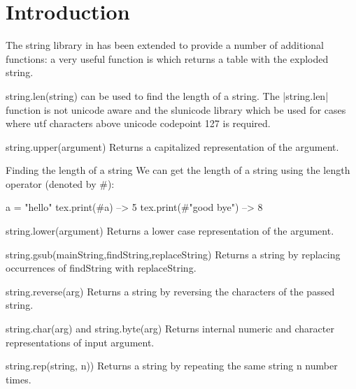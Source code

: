 \section{Introduction}


The \LUA string library in \LUA\tex has been extended to provide a number of additional functions: a very useful function is  which returns a table with the exploded string. 


\begin{docLua}{string.len(string)} 
can be used to find the length of a string.
The |string.len| function is not unicode aware and the slunicode library which be used for cases where utf characters above unicode codepoint 127 is required.
\end{docLua}


\begin{docLua}{string.upper(argument)}
Returns a capitalized representation of the argument.
\end{docLua}
\begin{texexample}{Finding the length of a string}{}
We can get the length of a string using the length operator (denoted by \#):
\begin{luacode}
a = "hello"
tex.print(#a) --> 5
tex.print(#"good bye") --> 8
\end{luacode}
\end{texexample}



\begin{docLua}{string.lower(argument)}
Returns a lower case representation of the argument.
\end{docLua}

\begin{docLua}{string.gsub(mainString,findString,replaceString)}
Returns a string by replacing occurrences of findString with replaceString.
\end{docLua}

\begin{docLua}{string.reverse(arg)}
Returns a string by reversing the characters of the passed string.
\end{docLua}

\begin{docLua}{string.char(arg)} 
and string.byte(arg)
Returns internal numeric and character representations of input argument.
\end{docLua}

\begin{docLua}{string.rep(string, n))}
Returns a string by repeating the same string n number times.
\end{docLua}



